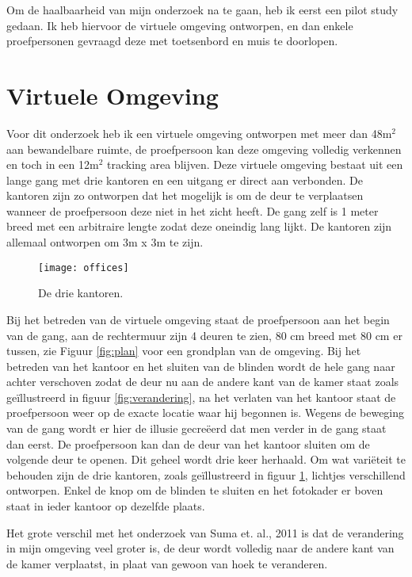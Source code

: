Om de haalbaarheid van mijn onderzoek na te gaan, heb ik eerst een pilot study
gedaan. Ik heb hiervoor de virtuele omgeving ontworpen, en dan enkele
proefpersonen gevraagd deze met toetsenbord en muis te doorlopen.

\section{Virtuele Omgeving}
Voor dit onderzoek heb ik een virtuele omgeving ontworpen met meer dan 48m$^2$
aan bewandelbare ruimte, de proefpersoon kan deze omgeving volledig verkennen en
toch in een 12m$^2$ tracking area blijven. Deze virtuele omgeving bestaat uit 
een lange gang met drie kantoren en een uitgang er direct aan verbonden. De 
kantoren zijn zo ontworpen dat het mogelijk is om de deur te verplaatsen wanneer 
de proefpersoon deze niet in het zicht heeft. De gang zelf is 1 meter breed met 
een arbitraire lengte zodat deze oneindig lang lijkt. De kantoren zijn allemaal 
ontworpen om 3m x 3m te zijn. 

\begin{figure}[b!]
    \centering
    \texttt{[image: offices]}
    \caption{De drie kantoren.}
    \label{fig:kantoren}
\end{figure}

Bij het betreden van de virtuele omgeving staat de proefpersoon aan het begin van
de gang, aan de rechtermuur zijn 4 deuren te zien, 80 cm breed met 80 cm er
tussen, zie Figuur \ref{fig:plan} voor een grondplan van de omgeving. Bij het 
betreden van het kantoor en het sluiten van de blinden wordt de hele gang naar 
achter verschoven zodat de deur nu aan de andere kant van de kamer staat zoals 
ge\"illustreerd in figuur \ref{fig:verandering}, na het verlaten van het kantoor 
staat de proefpersoon weer op de exacte locatie waar hij begonnen is. Wegens de 
beweging van de gang wordt er hier de illusie gecre\"eerd dat men verder in de 
gang staat dan eerst. De proefpersoon kan dan de deur van het kantoor sluiten 
om de volgende deur te openen. Dit geheel wordt drie keer herhaald. Om wat 
vari\"eteit te behouden zijn de drie kantoren, zoals ge\"illustreerd in 
figuur \ref{fig:kantoren}, lichtjes verschillend ontworpen. Enkel de knop om 
de blinden te sluiten en het fotokader er boven staat in ieder kantoor op 
dezelfde plaats.

Het grote verschil met het onderzoek van Suma et. al., 2011 \cite{suma11} is dat
de verandering in mijn omgeving veel groter is, de deur wordt volledig naar de
andere kant van de kamer verplaatst, in plaat van gewoon van hoek te veranderen.

